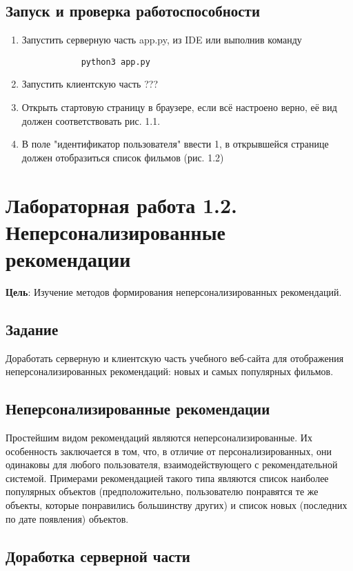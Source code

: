 \documentclass[a4paper,12pt]{report} %
\begin{document}
    \section{Запуск и проверка работоспособности}
    \begin{enumerate}
    	\item Запустить серверную часть app.py, из IDE или выполнив команду 
    	\begin{verbatim}
    		python3 app.py
    	\end{verbatim} 
        \item Запустить клиентскую часть ???
        \item Открыть стартовую страницу в браузере, если всё настроено верно, её вид должен соответствовать рис. 1.1.
        \item В поле "идентификатор пользователя" ввести 1, в открывшейся странице должен отобразиться список фильмов (рис. 1.2)
        
    \end{enumerate}

    \chapter {Лабораторная работа 1.2. Неперсонализированные рекомендации}
    \textbf{Цель}: Изучение методов формирования неперсонализированных рекомендаций.
    
    \section{Задание}
    Доработать серверную и клиентскую часть учебного веб-сайта для отображения неперсонализированных рекомендаций: новых и самых популярных фильмов.
    
    \section{Неперсонализированные рекомендации}
    Простейшим видом рекомендаций являются неперсонализированные. Их особенность заключается в том, что, в отличие от персонализированных, они одинаковы для любого пользователя, взаимодействующего с рекомендательной системой. Примерами рекомендацией такого типа являются список наиболее популярных объектов (предположительно, пользователю понравятся те же объекты, которые понравились большинству других) и список новых (последних по дате появления) объектов.    
    \section{Доработка серверной части}
\end{document}
